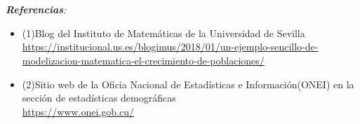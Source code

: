 \documentclass[11pt, letterpaper]{article}
\begin{document}
\\ \\\textit{\textbf{Referencias}:}
\begin{itemize}
    \item (1)Blog del Instituto de Matemáticas de la Universidad de Sevilla \\\url{https://institucional.us.es/blogimus/2018/01/un-ejemplo-sencillo-de-modelizacion-matematica-el-crecimiento-de-poblaciones/}
    \item (2)Sitio web de la Oficia Nacional de Estadísticas e Información(ONEI) en la sección de estadísticas demográficas \\ \url{https://www.onei.gob.cu/}
\end{itemize}
\end{document}
